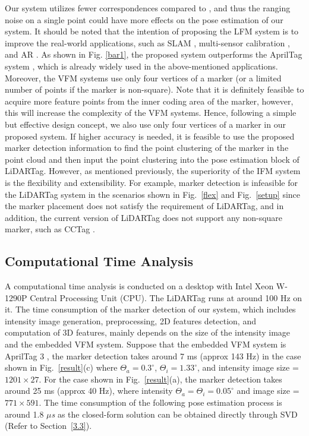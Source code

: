 Our system utilizes fewer correspondences compared to \cite{lt,lt2}, and thus the ranging noise on a single point could have more effects on the pose estimation of our system. It should be noted that the intention of proposing the LFM system is to improve the real-world applications, such as SLAM \cite{munoz2019}, multi-sensor calibration \cite{lt2}, and AR \cite{ar}. As shown in Fig. \ref{bar1}, the proposed system outperforms the AprilTag system \cite{ap3}, which is already widely used in the above-mentioned applications. Moreover, the VFM systems \cite{ap3,aruco} use only four vertices of a marker (or a limited number of points if the marker is non-square). Note that it is definitely feasible to acquire more feature points from the inner coding area of the marker, however, this will increase the complexity of the VFM systems. Hence, following a simple but effective design concept, we also use only four vertices of a marker in our proposed system. If higher accuracy is needed, it is feasible to use the proposed marker detection information to find the point clustering of the marker in the point cloud and then input the point clustering into the pose estimation block of LiDARTag. However, as mentioned previously, the superiority of the IFM system is the flexibility and extensibility. For example, marker detection is infeasible for the LiDARTag system \cite{lt} in the scenarios shown in Fig.~\ref{flex} and Fig.~\ref{setup} since the marker placement does not satisfy the requirement of LiDARTag, and in addition, the current version of LiDARTag does not support any non-square marker, such as CCTag \cite{cctag}.

\subsection{Computational Time Analysis}
A computational time analysis is conducted on a desktop with Intel Xeon W-1290P Central Processing Unit (CPU). The LiDARTag \cite{lt} runs at around 100 Hz on it. The time consumption of the marker detection of our system, which includes intensity image generation, preprocessing, 2D features detection, and computation of 3D features, mainly depends on the size of the intensity image and the embedded VFM system. Suppose that the embedded VFM system is AprilTag 3 \cite{ap3}, the marker detection takes around 7 ms (approx 143 Hz) in the case shown in Fig.~\ref{result}(c) where $\Theta_{a}=0.3^{\circ}$, $\Theta_{i}=1.33^{\circ}$, and intensity image size = $1201\times27$. For the case shown in  Fig.~\ref{result}(a), the marker detection takes around 25 ms (approx 40 Hz), where intensity  $\Theta_{a}=\Theta_{i}=0.05^{\circ}$ and image size = $771\times591$. The time consumption of the following pose estimation process is around 1.8 $\mu$\textit{s} as the closed-form solution can be obtained directly through SVD \cite{icp} (Refer to Section~\ref{3.3}).
